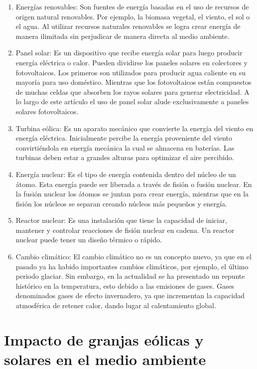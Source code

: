 \documentclass[12pt,spanish,Letterpaper,openany]{book}
\begin{document}
\begin{enumerate}
\def\labelenumi{\arabic{enumi}.}
\item
  {Energías renovables:} Son fuentes de energía basadas en el uso de recursos de origen natural renovables. Por ejemplo, la biomasa vegetal, el viento, el sol o el agua. Al utilizar recursos naturales renovables se logra crear energía de manera ilimitada sin perjudicar de manera directa al medio ambiente.
\item
  {Panel solar:} Es un dispositivo que recibe energía solar para luego producir energía eléctrica o calor. Pueden dividirse los paneles solares en colectores y fotovoltaicos. Los primeros son utilizados para producir agua caliente en su mayoría para uso doméstico. Mientras que los fotovoltaicos están compuestos de muchas celdas que absorben los rayos solares para generar electricidad. A lo largo de este artículo el uso de panel solar alude exclusivamente a paneles solares fotovoltaicos.
\item
  {Turbina eólica:} Es un aparato mecánico que convierte la energía del viento en energía eléctrica. Inicialmente percibe la energía proveniente del viento convirtiéndola en energía mecánica la cual se almacena en baterías. Las turbinas deben estar a grandes alturas para optimizar el aire percibido.
\item
  {Energía nuclear:} Es el tipo de energía contenida dentro del núcleo de un átomo. Esta energía puede ser liberada a través de fisión o fusión nuclear. En la fusión nuclear los átomos se juntan para crear energía, mientras que en la fisión los núcleos se separan creando núcleos más pequeños y energía.
\item
  {Reactor nuclear:} Es una instalación que tiene la capacidad de iniciar, mantener y controlar reacciones de fisión nuclear en cadena. Un reactor nuclear puede tener un diseño térmico o rápido.
\item
  {Cambio climático:} El cambio climático no es un concepto nuevo, ya que en el pasado ya ha habido importantes cambios climáticos, por ejemplo, el último periodo glaciar. Sin embargo, en la actualidad se ha presentado un repunte histórico en la temperatura, esto debido a las emisiones de gases. Gases denominados gases de efecto invernadero, ya que incrementan la capacidad atmosférica de retener calor, dando lugar al calentamiento global.
\end{enumerate}

\hypertarget{impacto-de-granjas-euxf3licas-y-solares-en-el-medio-ambiente}{%
\section{Impacto de granjas eólicas y solares en el medio ambiente}\label{impacto-de-granjas-euxf3licas-y-solares-en-el-medio-ambiente}}
\end{document}
